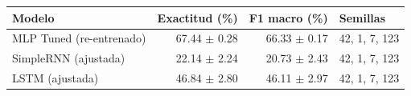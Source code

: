 \begin{tabular}{lrrl}
\toprule
Modelo & Exactitud (\%) & F1 macro (\%) & Semillas \\
\midrule
MLP Tuned (re-entrenado) & 67.44 $\pm$ 0.28 & 66.33 $\pm$ 0.17 & 42, 1, 7, 123 \\
SimpleRNN (ajustada) & 22.14 $\pm$ 2.24 & 20.73 $\pm$ 2.43 & 42, 1, 7, 123 \\
LSTM (ajustada) & 46.84 $\pm$ 2.80 & 46.11 $\pm$ 2.97 & 42, 1, 7, 123 \\
\bottomrule
\end{tabular}
